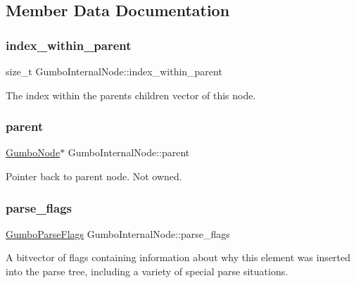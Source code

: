 \subsection{Member Data Documentation}
\mbox{\label{struct_gumbo_internal_node_a67a8817baad26cf4787620b8123e6754}} 
\subsubsection{\texorpdfstring{index\+\_\+within\+\_\+parent}{index\_within\_parent}}
{\footnotesize\ttfamily size\+\_\+t Gumbo\+Internal\+Node\+::index\+\_\+within\+\_\+parent}

The index within the parent\textquotesingle{}s children vector of this node. \mbox{\label{struct_gumbo_internal_node_ad466c80e05d66ac5f44357591301edc1}} 
\subsubsection{\texorpdfstring{parent}{parent}}
{\footnotesize\ttfamily \mbox{\hyperlink{gumbo_8h_a5f67d8397fda8fb7c90cc27f14ac4e7d}{Gumbo\+Node}}$\ast$ Gumbo\+Internal\+Node\+::parent}

Pointer back to parent node. Not owned. \mbox{\label{struct_gumbo_internal_node_a9ed83315056ffcd3b81eaf3db6965d65}} 
\subsubsection{\texorpdfstring{parse\+\_\+flags}{parse\_flags}}
{\footnotesize\ttfamily \mbox{\hyperlink{gumbo_8h_a74ff2c74a4bf7777efb2b9a29315e74b}{Gumbo\+Parse\+Flags}} Gumbo\+Internal\+Node\+::parse\+\_\+flags}

A bitvector of flags containing information about why this element was inserted into the parse tree, including a variety of special parse situations. \mbox{\label{struct_gumbo_internal_node_a8cd3706811e3d9558958dcae9f87eed9}} 
